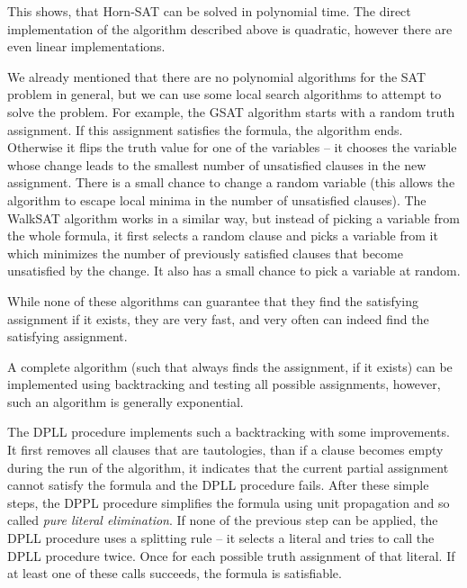This shows, that Horn-SAT can be solved in polynomial time. The direct implementation of the algorithm described above is quadratic, however there are even linear implementations.

We already mentioned that there are no polynomial algorithms for the SAT problem in general, but we can use some local search algorithms to attempt to solve the problem. For example, the GSAT algorithm starts with a random truth assignment. If this assignment satisfies the formula, the algorithm ends. Otherwise it flips the truth value for one of the variables -- it chooses the variable whose change leads to the smallest number of unsatisfied clauses in the new assignment. There is a small chance to change a random variable (this allows the algorithm to escape local minima in the number of unsatisfied clauses). The WalkSAT algorithm works in a similar way, but instead of picking a variable from the whole formula, it first selects a random clause and picks a variable from it which minimizes the number of previously satisfied clauses that become unsatisfied by the change. It also has a small chance to pick a variable at random. 

While none of these algorithms can guarantee that they find the satisfying assignment if it exists, they are very fast, and very often can indeed find the satisfying assignment.

A complete algorithm (such that always finds the assignment, if it exists) can be implemented using backtracking and testing all possible assignments, however, such an algorithm is generally exponential. 

The DPLL procedure implements such a backtracking with some improvements. It first removes all clauses that are tautologies, than if a clause becomes empty during the run of the algorithm, it indicates that the current partial assignment cannot satisfy the formula and the DPLL procedure fails. After these simple steps, the DPPL procedure simplifies the formula using unit propagation and so called \emph{pure literal elimination}. If none of the previous step can be applied, the DPLL procedure uses a splitting rule -- it selects a literal and tries to call the DPLL procedure twice. Once for each possible truth assignment of that literal. If at least one of these calls succeeds, the formula is satisfiable.
